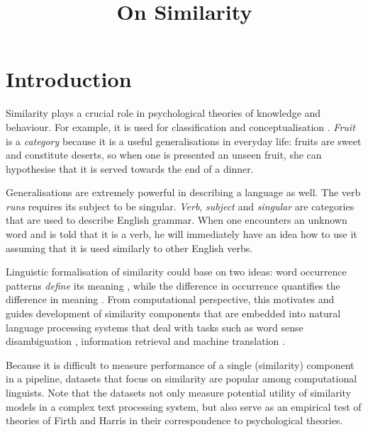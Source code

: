 \documentclass[11pt]{article}
\title{On Similarity}
\date{}
\begin{document}
\maketitle

\begin{abstract}

\end{abstract}

\section{Introduction}
\label{sec:introduction}

Similarity plays a crucial role in psychological theories of knowledge and behaviour. For example, it is used for classification and conceptualisation \cite{Tversky1977}. \textit{Fruit} is a \emph{category} because it is a useful generalisations in everyday life: fruits are sweet and constitute deserts, so when one is presented an unseen fruit, she can hypothesise that it is served towards the end of a dinner.

Generalisations are extremely powerful in describing a language as well. The verb \textit{runs} requires its subject to be singular. \textit{Verb}, \textit{subject} and \textit{singular} are categories that are used to describe English grammar. When one encounters an unknown word and is told that it is a verb, he will immediately have an idea how to use it assuming that it is used similarly to other English verbs.

Linguistic formalisation of similarity could base on two ideas: word occurrence patterns \emph{define} its meaning \cite{firth1957lingtheory}, while the difference in occurrence \textup{quantifies} the difference in meaning \cite{harris1954distributional}. From computational perspective, this motivates and guides development of similarity components that are embedded into natural language processing systems that deal with tasks such as word sense disambiguation \cite{Schutze:1998:AWS:972719.972724}, information retrieval \cite{Salton:1975:VSM:361219.361220} and machine translation \cite{Dagan:1993:CWS:981574.981596}.

Because it is difficult to measure performance of a single (similarity) component in a pipeline, datasets that focus on similarity are popular among computational linguists. Note that the datasets not only measure potential utility of similarity models in a complex text processing system, but also serve as an empirical test of theories of Firth and Harris in their correspondence to psychological theories.
\end{document}
